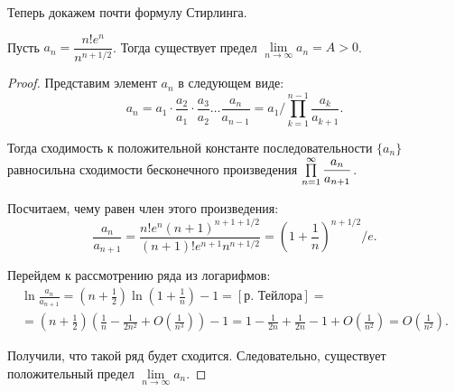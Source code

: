 \documentclass[a4paper, 12pt]{article}
\begin{document}
Теперь докажем почти формулу Стирлинга.
\begin{Statement}
Пусть $a_n = \dfrac{n!e^n}{n^{n + 1/2}}$. Тогда существует предел $\lim\limits_{n \to \infty}a_n = A > 0$.
\end{Statement}
\begin{proof}
Представим элемент $a_n$ в следующем виде:
$$
a_n = a_1 \cdot \frac{a_2}{a_1}\cdot\frac{a_3}{a_2} \ldots \frac{a_n}{a_{n-1}} = a_1 / \prod\limits_{k=1}^{n-1} \frac{a_k}{a_{k+1}}.
$$

Тогда сходимость к положительной константе последовательности $\{a_n\}$ равносильна сходимости бесконечного произведения $\prod\limits_{n=1}^{\infty} \dfrac{a_n}{a_{n+1}}$.

Посчитаем, чему равен член этого произведения:
$$
\frac{a_n}{a_{n+1}} = \frac{n!e^n (n+1)^{n+1+1/2}}{(n+1)! e^{n+1}n^{n+1/2} } = \left(1 + \frac{1}{n} \right)^{n + 1/2} / e.
$$

Перейдем к рассмотрению ряда из логарифмов:
\begin{gather*}
\ln \frac{a_n}{a_{n+1}} = \left( n + \frac{1}{2}\right)\ln\left( 1 + \frac{1}{n}\right) - 1 = [\text{р. Тейлора}] = \\ =\left(n + \frac{1}{2}\right)\left( \frac{1}{n} - \frac{1}{2n^2} + O\left(\frac{1}{n^3} \right) \right) - 1 = 1 - \frac{1}{2n} + \frac{1}{2n} - 1 + O\left(\frac{1}{n^2} \right) = O\left(\frac{1}{n^2} \right).
\end{gather*}


Получили, что такой ряд будет сходится. Следовательно, существует положительный предел $\lim\limits_{n \to \infty}a_n$.

\end{proof}
\end{document}
